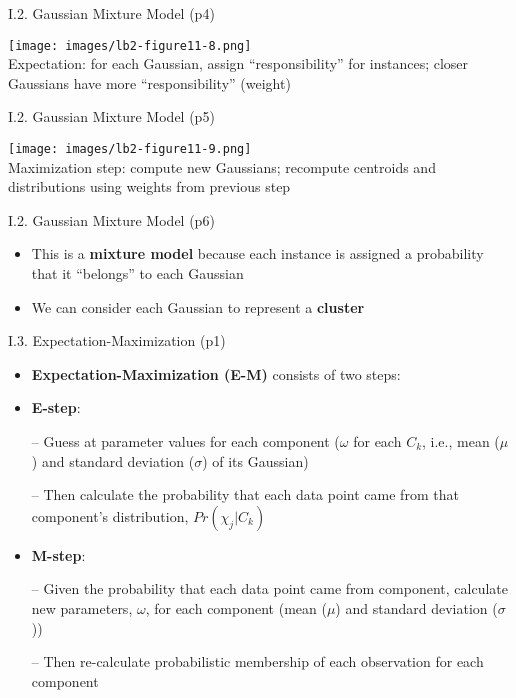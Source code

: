 \documentclass[handout]{beamer}
\newcommand{\stronger}[1]{\textbf{\color{purple} #1}}
\begin{document}
\begin{frame}{I.2. Gaussian Mixture Model (p4)}
\begin{center}
\texttt{[image: images/lb2-figure11-8.png]}\\
Expectation: for each Gaussian, assign ``responsibility'' for instances; closer Gaussians have more ``responsibility'' (weight)\\
\cite[Figure 11.8]{LB2:2004}
\end{center}
\end{frame}
\begin{frame}{I.2. Gaussian Mixture Model (p5)}
\begin{center}
\texttt{[image: images/lb2-figure11-9.png]}\\
Maximization step: compute new Gaussians; recompute centroids and distributions using weights from previous step\\
\cite[Figure 11.9]{LB2:2004}
\end{center}
\end{frame}
\begin{frame}{I.2. Gaussian Mixture Model (p6)}
\begin{itemize}
\item This is a \stronger{mixture model} because each instance is assigned a probability that it ``belongs'' to each Gaussian
\item[]
\item We can consider each Gaussian to represent a \stronger{cluster}
\end{itemize}
\end{frame}
\begin{frame}{I.3. Expectation-Maximization (p1)}
\begin{itemize}
\item \stronger{Expectation-Maximization (E-M)} consists of two steps:
\item[]
\item \stronger{E-step}:
\item[--] Guess at parameter values for each component ($\omega$ for each $C_k$, i.e., mean ($\mu$) and standard deviation ($\sigma$) of its Gaussian)
\item[--] Then calculate the probability that each data point came from that component's distribution,
$Pr(\chi_j|C_k)$
\item[]
\item \stronger{M-step}:
\item[--] Given the probability that each data point came from component, calculate new parameters, $\omega$, for each component (mean ($\mu$) and standard deviation ($\sigma$))
\item[--] Then re-calculate probabilistic membership of each observation for each component
\end{itemize}
\end{frame}
\end{document}
